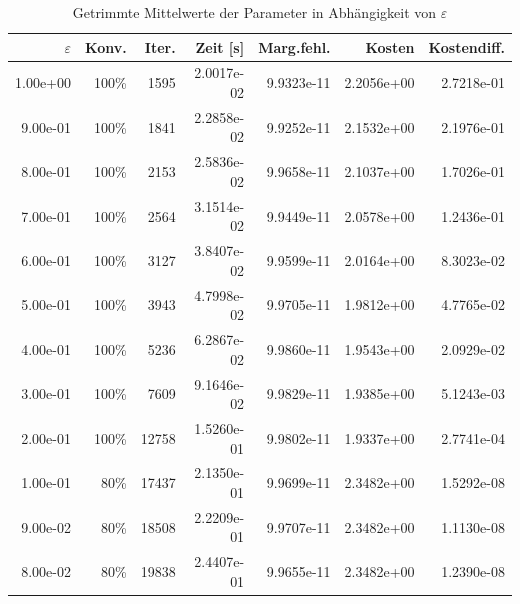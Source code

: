 \begin{table}[htbp]
\caption{Getrimmte Mittelwerte der Parameter in Abhängigkeit von $\varepsilon$}
\label{tab:Parametertest64_tol1e-10}
\small
\centering
{}
\begin{tabular}{rrrrrrr}
\toprule
$\varepsilon$ & Konv. & Iter. & Zeit [s] & Marg.fehl. & Kosten & Kostendiff. \\
\midrule
1.00e+00 & 100\% & 1595 & 2.0017e-02 & 9.9323e-11 & 2.2056e+00 & 2.7218e-01 \\
9.00e-01 & 100\% & 1841 & 2.2858e-02 & 9.9252e-11 & 2.1532e+00 & 2.1976e-01 \\
8.00e-01 & 100\% & 2153 & 2.5836e-02 & 9.9658e-11 & 2.1037e+00 & 1.7026e-01 \\
7.00e-01 & 100\% & 2564 & 3.1514e-02 & 9.9449e-11 & 2.0578e+00 & 1.2436e-01 \\
6.00e-01 & 100\% & 3127 & 3.8407e-02 & 9.9599e-11 & 2.0164e+00 & 8.3023e-02 \\
5.00e-01 & 100\% & 3943 & 4.7998e-02 & 9.9705e-11 & 1.9812e+00 & 4.7765e-02 \\
4.00e-01 & 100\% & 5236 & 6.2867e-02 & 9.9860e-11 & 1.9543e+00 & 2.0929e-02 \\
3.00e-01 & 100\% & 7609 & 9.1646e-02 & 9.9829e-11 & 1.9385e+00 & 5.1243e-03 \\
2.00e-01 & 100\% & 12758 & 1.5260e-01 & 9.9802e-11 & 1.9337e+00 & 2.7741e-04 \\
1.00e-01 & 80\% & 17437 & 2.1350e-01 & 9.9699e-11 & 2.3482e+00 & 1.5292e-08 \\
9.00e-02 & 80\% & 18508 & 2.2209e-01 & 9.9707e-11 & 2.3482e+00 & 1.1130e-08 \\
8.00e-02 & 80\% & 19838 & 2.4407e-01 & 9.9655e-11 & 2.3482e+00 & 1.2390e-08 \\
\bottomrule
\end{tabular}
\end{table}
